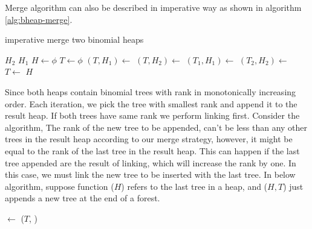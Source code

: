 \documentclass{article}
\begin{document}
Merge algorithm can also be described in imperative way as shown
in algorithm \ref{alg:bheap-merge}.

\begin{algorithm}
\caption{imperative merge two binomial heaps}
\label{alg:bheap-merge}
\begin{algorithmic}
    \State \Return $H_2$
  \EndIf
    \State \Return $H_1$
  \EndIf
  \State $H \gets \phi$
    \State $T \gets \phi$
      \State $(T, H_1) \gets $ 
      \State $(T, H_2) \gets $ 
    \Else {}
      \State $(T_1, H_1) \gets $ 
      \State $(T_2, H_2) \gets $ 
      \State $T \gets $ 
    \EndIf
    \State {}
  \EndWhile
    \State {}
  \EndIf
    \State {}
  \EndIf
  \State \Return $H$
\EndFunction
\end{algorithmic}
\end{algorithm}

Since both heaps contain binomial trees with rank in monotonically 
increasing order. Each iteration, we pick the tree with smallest
rank and append it to the result heap. If both trees have same rank
we perform linking first. Consider the  algorithm,
The rank of the new tree to be appended, can't be less than
any other trees in the result heap according to our merge strategy,
however, it might be equal to the rank of the last tree in the 
result heap. This can happen if the last tree appended are the
result of linking, which will increase the rank by one. In this
case, we must link the new tree to be inserted with the last tree.
In below algorithm, suppose function ($H$) refers 
to the last tree in a heap, and ($H, T$) just 
appends a new tree at the end of a forest. 

\begin{algorithmic}
    \State {} $\gets$ ($T$, )
  \Else
    \State {}
  \EndIf
\EndFunction
\end{algorithmic}
\end{document}
